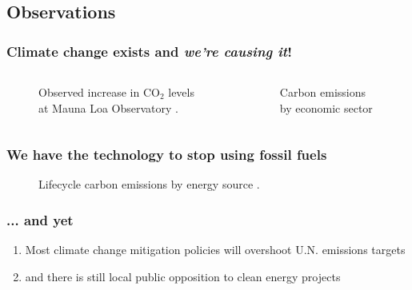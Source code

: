 \subsection{Observations}
\begin{frame}
    \frametitle{Climate change exists and \textit{we're causing it}!}

    \begin{columns}
        \column[t]{5cm}
        \begin{figure}
            \centering
            \resizebox{\columnwidth}{!}{}            
            \caption{Observed increase in CO$_2$ levels at Mauna Loa Observatory
            \cite{kane_atmospheric_1996}.}
            \label{figure:mauna-loa}
        \end{figure}
        
        \column[t]{5cm}
        \begin{figure}
            \centering
            \resizebox{\columnwidth}{!}{}
            \caption{Carbon emissions by economic sector
            \cite{epa_inventory_2023}}
            \label{figure:sector-emissions}
        \end{figure}
    \end{columns}

\end{frame}

\begin{frame}
    \frametitle{We have the technology to stop using fossil fuels}

    \begin{figure}
        \centering
        \resizebox{0.75\columnwidth}{!}{}
        \caption{Lifecycle carbon emissions by energy source
        \cite{united_nations_economic_commission_for_europe_carbon_2022}.}
        \label{figure:energy-emissions}
    \end{figure}

\end{frame}


\begin{frame}
    \frametitle{... and yet}

    \begin{enumerate}
        \item Most climate change mitigation policies will overshoot U.N.
        emissions targets \cite{roelfsema_taking_2020}
        \item and there is still local public opposition to clean energy
        projects 
        \cite{aitken_why_2010,firestone_public_2012,stokes_prevalence_2023}
    \end{enumerate}

\end{frame}

